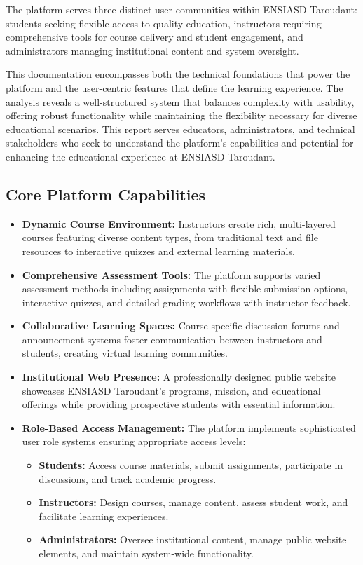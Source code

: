 \documentclass[12pt,a4paper]{article}
\begin{document}
The platform serves three distinct user communities within ENSIASD Taroudant: students seeking flexible access to quality education, instructors requiring comprehensive tools for course delivery and student engagement, and administrators managing institutional content and system oversight.

This documentation encompasses both the technical foundations that power the platform and the user-centric features that define the learning experience. The analysis reveals a well-structured system that balances complexity with usability, offering robust functionality while maintaining the flexibility necessary for diverse educational scenarios. This report serves educators, administrators, and technical stakeholders who seek to understand the platform's capabilities and potential for enhancing the educational experience at ENSIASD Taroudant.

\subsection{Core Platform Capabilities}

\begin{itemize}
    \item \textbf{Dynamic Course Environment:} Instructors create rich, multi-layered courses featuring diverse content types, from traditional text and file resources to interactive quizzes and external learning materials.
    \item \textbf{Comprehensive Assessment Tools:} The platform supports varied assessment methods including assignments with flexible submission options, interactive quizzes, and detailed grading workflows with instructor feedback.
    \item \textbf{Collaborative Learning Spaces:} Course-specific discussion forums and announcement systems foster communication between instructors and students, creating virtual learning communities.
    \item \textbf{Institutional Web Presence:} A professionally designed public website showcases ENSIASD Taroudant's programs, mission, and educational offerings while providing prospective students with essential information.
    \item \textbf{Role-Based Access Management:} The platform implements sophisticated user role systems ensuring appropriate access levels:
    \begin{itemize}
        \item \textbf{Students:} Access course materials, submit assignments, participate in discussions, and track academic progress.
        \item \textbf{Instructors:} Design courses, manage content, assess student work, and facilitate learning experiences.
        \item \textbf{Administrators:} Oversee institutional content, manage public website elements, and maintain system-wide functionality.
    \end{itemize}
\end{itemize}
\end{document}
